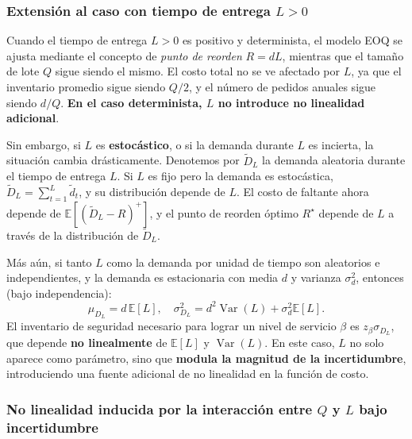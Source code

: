 \documentclass[
  spanish,
  us-letterpaper,
  DIV=11,
  numbers=noendperiod]{scrreprt}
\numberwithin{equation}{section}
\begin{document}
\subsubsection{\texorpdfstring{Extensión al caso con tiempo de entrega
\(L > 0\)}{Extensión al caso con tiempo de entrega L \textgreater{} 0}}\label{extensiuxf3n-al-caso-con-tiempo-de-entrega-l-0}

Cuando el tiempo de entrega \(L > 0\) es positivo y determinista, el
modelo EOQ se ajusta mediante el concepto de \emph{punto de reorden}
\(R = d L\), mientras que el tamaño de lote \(Q\) sigue siendo el mismo.
El costo total no se ve afectado por \(L\), ya que el inventario
promedio sigue siendo \(Q/2\), y el número de pedidos anuales sigue
siendo \(d/Q\). \textbf{En el caso determinista, \(L\) no introduce no
linealidad adicional}.

Sin embargo, si \(L\) es \textbf{estocástico}, o si la demanda durante
\(L\) es incierta, la situación cambia drásticamente. Denotemos por
\(\tilde{D}_L\) la demanda aleatoria durante el tiempo de entrega \(L\).
Si \(L\) es fijo pero la demanda es estocástica,
\(\tilde{D}_L = \sum_{t=1}^L \tilde{d}_t\), y su distribución depende de
\(L\). El costo de faltante ahora depende de
\(\mathbb{E}[(\tilde{D}_L - R)^+]\), y el punto de reorden óptimo
\(R^\star\) depende de \(L\) a través de la distribución de
\(\tilde{D}_L\).

Más aún, si tanto \(L\) como la demanda por unidad de tiempo son
aleatorios e independientes, y la demanda es estacionaria con media
\(d\) y varianza \(\sigma_d^2\), entonces (bajo independencia): \[
\mu_{D_L} = d \, \mathbb{E}[L], \quad \sigma_{D_L}^2 = d^2 \operatorname{Var}(L) + \sigma_d^2 \mathbb{E}[L].
\] El inventario de seguridad necesario para lograr un nivel de servicio
\(\beta\) es \(z_\beta \sigma_{D_L}\), que depende \textbf{no
linealmente} de \(\mathbb{E}[L]\) y \(\operatorname{Var}(L)\). En este
caso, \(L\) no solo aparece como parámetro, sino que \textbf{modula la
magnitud de la incertidumbre}, introduciendo una fuente adicional de no
linealidad en la función de costo.

\subsubsection{\texorpdfstring{No linealidad inducida por la interacción
entre \(Q\) y \(L\) bajo
incertidumbre}{No linealidad inducida por la interacción entre Q y L bajo incertidumbre}}\label{no-linealidad-inducida-por-la-interacciuxf3n-entre-q-y-l-bajo-incertidumbre}
\end{document}
